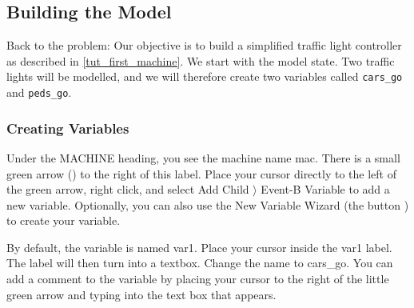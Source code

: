 \subsection{Building the Model}
\label{tut_building_the_model}

Back to the problem: Our objective is to build a simplified traffic light controller as described in \ref{tut_first_machine}.  We start with the model state.  Two traffic lights will be modelled, and we will therefore create two variables called  \texttt{cars\_go} and \texttt{peds\_go}.  

\subsubsection{Creating Variables}

Under the \textsf{MACHINE} heading, you see the machine name \textsf{mac}. There is a small green arrow () to the right of this label. Place your cursor directly to the left of the green arrow, right click, and select \textsf{Add Child $\rangle$ Event-B Variable} to add a new variable. Optionally, you can also use the New Variable Wizard (the button ) to create your variable. 

By default, the variable is named \textsf{var1}. Place your cursor inside the \textsf{var1} label. The label will then turn into a textbox. Change the name to \textsf{cars\_go}. You can add a comment to the variable by placing your cursor to the right of the little green arrow and typing into the text box that appears.




